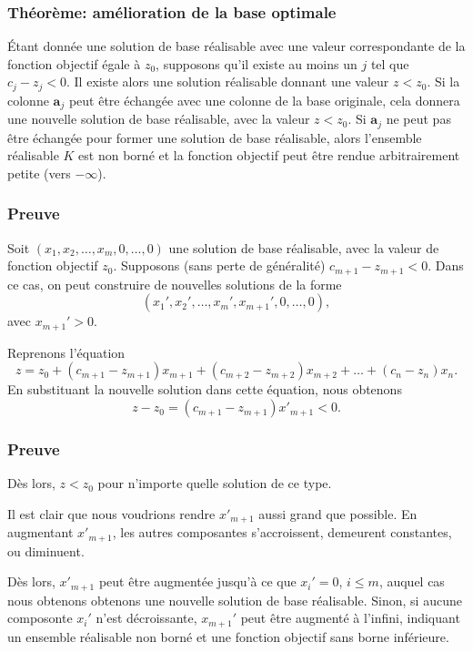 \documentclass[t,usepdftitle=false]{beamer}
\def\ba{\boldsymbol{a}}
\begin{document}
\begin{frame}
\frametitle{Théorème: amélioration de la base optimale}

\'Etant donnée une solution de base réalisable avec une valeur correspondante de la fonction objectif égale à $z_0$, supposons qu'il existe au moins un $j$ tel que $c_j - z_j < 0$. Il existe alors une solution réalisable donnant une valeur $z < z_0$.
Si la colonne $\ba_j$ peut être échangée avec une colonne de la base originale, cela donnera une nouvelle solution de base réalisable, avec la valeur $z < z_0$. Si $\ba_j$ ne peut pas être échangée pour former une solution de base réalisable, alors l'ensemble réalisable $K$ est non borné et la fonction objectif peut être rendue arbitrairement petite (vers $-\infty$).

\end{frame}

\begin{frame}
\frametitle{Preuve}

Soit $(x_1, x_2,\ldots, x_m, 0,\ldots,0)$ une solution de base réalisable, avec la valeur de fonction objectif $z_0$. Supposons (sans perte de généralité) $c_{m+1} - z_{m+1} < 0$. Dans ce cas, on peut construire de nouvelles solutions de la forme
\[
(x_1', x_2', \ldots, x_m', x_{m+1}', 0, \ldots, 0),
\]
avec $x_{m+1}' > 0$.

\mbox{}

Reprenons l'équation
\[
z = z_0 + (c_{m+1} - z_{m+1})x_{m+1}
+ (c_{m+2} - z_{m+2})x_{m+2} + \ldots
+ (c_{n} - z_n) x_{n}.
\]
En substituant la nouvelle solution dans cette équation, nous obtenons
\[
z - z_0 = (c_{m+1} - z_{m+1})x'_{m+1} < 0.
\]

\end{frame}

\begin{frame}
\frametitle{Preuve}

Dès lors, $z < z_0$ pour n'importe quelle solution de ce type.

\mbox{}

Il est clair que nous voudrions rendre $x'_{m+1}$ aussi grand que possible. En augmentant $x'_{m+1}$, les autres composantes s'accroissent, demeurent constantes, ou diminuent.

\mbox{}

Dès lors, $x'_{m+1}$ peut être augmentée jusqu'à ce que $x_i' = 0$, $i \leq m$, auquel cas nous obtenons obtenons une nouvelle solution de base réalisable. Sinon, si aucune composonte $x_i'$ n'est décroissante, $x_{m+1}'$ peut être augmenté à l'infini, indiquant un ensemble réalisable non borné et une fonction objectif sans borne inférieure.
\end{frame}
\end{document}
